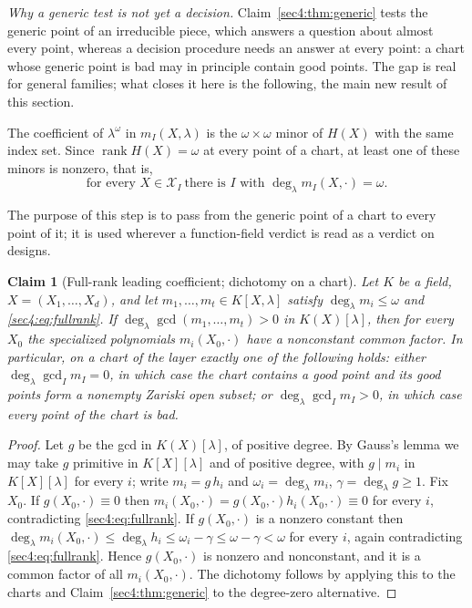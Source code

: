 \documentclass[journal]{IEEEtran}
\theoremstyle{plainn}
\newtheorem{claim}{Claim}
\theoremstyle{remark}
\newcommand{\rank}{\operatorname{rank}}
\begin{document}
\emph{Why a generic test is not yet a decision.} Claim~\ref{sec4:thm:generic} tests the generic point
of an irreducible piece, which answers a question about almost every point, whereas a decision
procedure needs an answer at every point: a chart whose generic point is bad may in principle contain
good points. The gap is real for general families; what closes it here is the following, the main new
result of this section.

The coefficient of $\lambda^\omega$ in $m_I(X,\lambda)$ is the $\omega\times\omega$ minor of $H(X)$
with the same index set. Since $\rank H(X)=\omega$ at every point of a chart, at least one of these
minors is nonzero, that is,
\begin{equation}
\label{sec4:eq:fullrank}
\text{for every }X\in\mathcal X_I\ \text{there is }I\text{ with }
\deg_\lambda m_I(X,\cdot)=\omega .
\end{equation}


The purpose of this step is to pass from the generic point of a chart to every point of it; it is used
wherever a function-field verdict is read as a verdict on designs.

\begin{claim}[Full-rank leading coefficient; dichotomy on a chart]
\label{sec4:lem:fullrank}
\label{sec4:cor:dichotomy}
Let $K$ be a field, $X=(X_1,\dots,X_d)$, and let $m_1,\dots,m_t\in K[X,\lambda]$ satisfy
$\deg_\lambda m_i\le\omega$ and \eqref{sec4:eq:fullrank}. If
$\deg_\lambda\gcd(m_1,\dots,m_t)>0$ in $K(X)[\lambda]$, then for \emph{every} $X_0$ the specialized
polynomials $m_i(X_0,\cdot)$ have a nonconstant common factor. In particular, on a chart of the layer
exactly one of the following holds: either $\deg_\lambda\gcd_I m_I=0$, in which case the chart contains
a good point and its good points form a nonempty Zariski open subset; or
$\deg_\lambda\gcd_I m_I>0$, in which case \emph{every} point of the chart is bad.
\end{claim}

\begin{proof}
Let $g$ be the gcd in $K(X)[\lambda]$, of positive degree. By Gauss's lemma \cite{lan02} we may take
$g$ primitive in $K[X][\lambda]$ and of positive degree, with $g\mid m_i$ in $K[X][\lambda]$ for every
$i$; write $m_i=g\,h_i$ and $\omega_i=\deg_\lambda m_i$, $\gamma=\deg_\lambda g\ge1$. Fix $X_0$. If
$g(X_0,\cdot)\equiv0$ then $m_i(X_0,\cdot)=g(X_0,\cdot)h_i(X_0,\cdot)\equiv0$ for every $i$,
contradicting \eqref{sec4:eq:fullrank}. If $g(X_0,\cdot)$ is a nonzero constant then
$\deg_\lambda m_i(X_0,\cdot)\le\deg_\lambda h_i\le\omega_i-\gamma\le\omega-\gamma<\omega$ for every
$i$, again contradicting \eqref{sec4:eq:fullrank}. Hence $g(X_0,\cdot)$ is nonzero and nonconstant, and
it is a common factor of all $m_i(X_0,\cdot)$. The dichotomy follows by applying this to the charts and
Claim~\ref{sec4:thm:generic} to the degree-zero alternative.
\end{proof}
\end{document}
